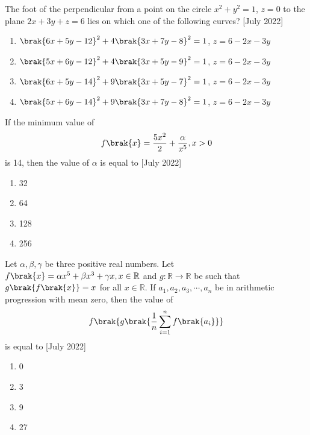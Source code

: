 \iffalse
\title{2022}
\author{AI24BTECH11009}
\section{mcq-single}
\fi
\item The foot of the perpendicular from a point on the circle $x^2 + y^2 = 1$, $z = 0$ to the plane $2x + 3y + z = 6$ lies on which one of the following curves? \hfill[July 2022]
\begin{enumerate}
    \item $\brak{6x + 5y - 12}^2 + 4\brak{3x + 7y - 8}^2 = 1$, $z = 6 - 2x - 3y$
    \item $\brak{5x + 6y - 12}^2 + 4\brak{3x + 5y - 9}^2 = 1$, $z = 6 - 2x - 3y$
    \item $\brak{6x + 5y - 14}^2 + 9\brak{3x + 5y - 7}^2 = 1$, $z = 6 - 2x - 3y$
    \item $\brak{5x + 6y - 14}^2 + 9\brak{3x + 7y - 8}^2 = 1$, $z = 6 - 2x - 3y$\\
\end{enumerate}
\item If the minimum value of 
\begin{align*}
    f\brak{x} = \frac{5x^2}{2} + \frac{\alpha}{x^5}, x>0
\end{align*}
is 14, then the value of $\alpha$ is equal to \hfill[July 2022]
  \begin{enumerate}
      \item 32
      \item 64
      \item 128
      \item 256\\
  \end{enumerate}
\item Let $\alpha, \beta, \gamma$ be three positive real numbers. Let $f\brak{x} = \alpha x^5 + \beta x^3 + \gamma x, x \in \mathbb{R}$ and $g:\mathbb{R}\rightarrow\mathbb{R}$ be such that $g\brak{f\brak{x}} = x$ for all $x\in\mathbb{R}$. If $a_1, a_2, a_3, \cdots, a_n$ be in arithmetic progression with mean zero, then the value of 
\begin{align*}
    f\brak{g\brak{\frac{1}{n}\sum_{i=1}^{n}f\brak{a_i}}}
\end{align*}
is equal to \hfill[July 2022]
     \begin{enumerate}
         \item 0
         \item 3
         \item 9
         \item 27\\
     \end{enumerate}
